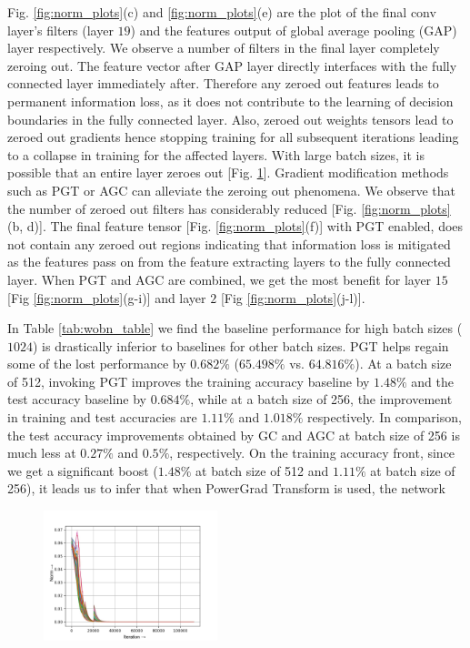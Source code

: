 \documentclass[runningheads]{llncs}
\begin{document}
Fig. \ref{fig:norm_plots}(c) and \ref{fig:norm_plots}(e) are the plot of the final conv
layer's filters (layer $19$) and the features output of global average pooling (GAP)
layer respectively. We observe a number of filters in the final layer completely zeroing
out. The feature vector after GAP layer directly interfaces with the fully connected
layer immediately after. Therefore any zeroed out features leads to permanent
information loss, as it does not contribute to the learning of decision boundaries in
the fully connected layer. Also, zeroed out weights tensors lead to zeroed out gradients
hence stopping training for all subsequent iterations leading to a collapse in training
for the affected layers. With large batch sizes, it is possible that an entire layer
zeroes out [Fig. \ref{fig:high_bs}]. Gradient modification methods such as PGT or AGC
can alleviate the zeroing out phenomena. We observe that the number of zeroed out
filters has considerably reduced [Fig. \ref{fig:norm_plots}(b, d)]. The final feature
tensor [Fig. \ref{fig:norm_plots}(f)] with PGT enabled, does not contain any zeroed out
regions indicating that information loss is mitigated as the features pass on from the
feature extracting layers to the fully connected layer. When PGT and AGC are combined,
we get the most benefit for layer $15$ [Fig \ref{fig:norm_plots}(g-i)] and layer $2$
[Fig \ref{fig:norm_plots}(j-l)].







In Table \ref{tab:wobn_table} we find the baseline performance for high batch sizes
($1024$) is drastically inferior to baselines for other batch sizes. PGT helps regain
some of the lost performance by $0.682\%$ ($65.498\%$ vs. $64.816\%$). At a batch size
of 512, invoking PGT improves the training accuracy baseline by $1.48\%$ and the test
accuracy baseline by $0.684\%$, while at a batch size of 256, the improvement in
training and test accuracies are $1.11\%$ and $1.018\%$ respectively. In comparison, the
test accuracy improvements obtained by GC and AGC at batch size of 256
is much less at $0.27\%$ and $0.5\%$, respectively. On the training accuracy front,
since we get a significant boost ($1.48\%$ at batch size of 512 and $1.11\%$ at batch
size of 256), it leads us to infer that when PowerGrad Transform is used, the network


\begin{figure}
\vspace{-1cm}
\centering
\includegraphics[width=0.45\textwidth]{baseline_high_bs-w-layer2-2}
\caption{}
\label{fig:high_bs}
\vspace{-2cm}
\end{figure}
\end{document}
